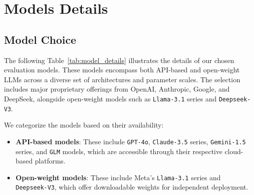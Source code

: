 \section{Models Details}
\subsection{Model Choice}
\label{app:model_choice}
The following Table~\ref{tab:model_details} illustrates the details of our chosen evaluation models. These models encompass both API-based and open-weight LLMs across a diverse set of architectures and parameter scales. The selection includes major proprietary offerings from OpenAI, Anthropic, Google, and DeepSeek, alongside open-weight models such as \texttt{Llama-3.1} series and \texttt{Deepseek-V3}. 

We categorize the models based on their availability:
\begin{itemize}
    \item \textbf{API-based models}: These include \texttt{GPT-4o}, \texttt{Claude-3.5} series, \texttt{Gemini-1.5} series, and \texttt{GLM} models, which are accessible through their respective cloud-based platforms.
    \item \textbf{Open-weight models}: These include Meta's \texttt{Llama-3.1} series and \texttt{Deepseek-V3}, which offer downloadable weights for independent deployment.
\end{itemize}


